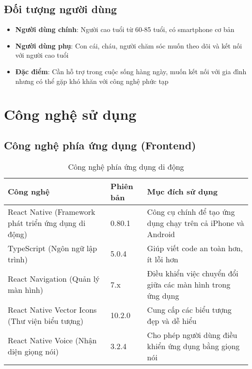 \documentclass[12pt,a4paper]{article}
\begin{document}
\subsection{Đối tượng người dùng}
\begin{itemize}[leftmargin=2cm]
    \item \textbf{Người dùng chính}: Người cao tuổi từ 60-85 tuổi, có smartphone cơ bản
    \item \textbf{Người dùng phụ}: Con cái, cháu, người chăm sóc muốn theo dõi và kết nối với người cao tuổi
    \item \textbf{Đặc điểm}: Cần hỗ trợ trong cuộc sống hàng ngày, muốn kết nối với gia đình nhưng có thể gặp khó khăn với công nghệ phức tạp
\end{itemize}

\section{Công nghệ sử dụng}

\subsection{Công nghệ phía ứng dụng (Frontend)}
\begin{table}[H]
\centering
\begin{tabular}{|p{4cm}|p{3cm}|p{8cm}|}
\hline
\textbf{Công nghệ} & \textbf{Phiên bản} & \textbf{Mục đích sử dụng} \\
\hline
React Native (Framework phát triển ứng dụng di động) & 0.80.1 & Công cụ chính để tạo ứng dụng chạy trên cả iPhone và Android \\
\hline
TypeScript (Ngôn ngữ lập trình) & 5.0.4 & Giúp viết code an toàn hơn, ít lỗi hơn \\
\hline
React Navigation (Quản lý màn hình) & 7.x & Điều khiển việc chuyển đổi giữa các màn hình trong ứng dụng \\
\hline
React Native Vector Icons (Thư viện biểu tượng) & 10.2.0 & Cung cấp các biểu tượng đẹp và dễ hiểu \\
\hline
React Native Voice (Nhận diện giọng nói) & 3.2.4 & Cho phép người dùng điều khiển ứng dụng bằng giọng nói \\
\hline
\end{tabular}
\caption{Công nghệ phía ứng dụng di động}
\end{table}
\end{document}
